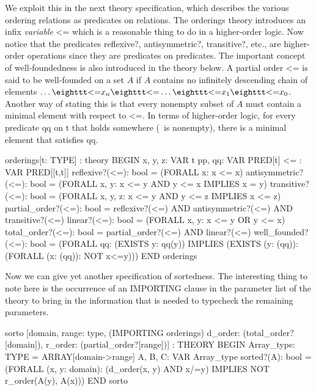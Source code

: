 We exploit this in the next theory specification, which describes the
various ordering relations as predicates on relations.  The {\stt
orderings} theory introduces an infix {\em variable\/} {\stt <=} which
is a reasonable thing to do in a higher-order logic.  Now notice that
the predicates {\stt reflexive?}, {\stt antisymmetric?}, {\stt
transitive?}, etc., are higher-order operations since they are
predicates on predicates.  The important concept of well-foundedness is
also introduced in the theory below.  A partial order {\stt <=} is said
to be well-founded on a set $A$ if $A$ contains no infinitely descending
chain of elements $\ldots \mbox{\tt <=} x_n \mbox{\tt <=} \ldots
\mbox{\tt <=} x_1 \mbox{\tt <=} x_0$.  Another way of stating this is
that every nonempty subset of $A$ must contain a minimal element with
respect to {\stt <=}.  In terms of higher-order logic, for every
predicate {\stt qq} on {\stt t} that holds somewhere (\ie\ is nonempty),
there is a minimal element that satisfies {\stt qq}.

\begin{pvsexample}
  orderings[t: TYPE] : theory
   BEGIN
    x, y, z: VAR t
    pp, qq: VAR PRED[t]
    <= : VAR PRED[[t,t]]
    reflexive?(<=): bool =  (FORALL x: x <= x)
    antisymmetric?(<=): bool = (FORALL x, y: x <= y AND y <= x IMPLIES x = y)
    transitive?(<=): bool =
      (FORALL x, y, z: x <= y AND y <= z IMPLIES x <= z)
    partial_order?(<=): bool =
      reflexive?(<=) AND antisymmetric?(<=) AND transitive?(<=)
    linear?(<=): bool = (FORALL x, y: x <= y OR y <= x)
    total_order?(<=): bool = partial_order?(<=) AND linear?(<=)
    well_founded?(<=): bool =
      (FORALL qq: (EXISTS y: qq(y))
           IMPLIES (EXISTS (y: (qq)): (FORALL (x: (qq)): NOT x<=y)))
   END orderings
\end{pvsexample}

Now we can give yet another specification of sortedness.  The
interesting thing to note here is the occurrence of an {\stt IMPORTING}
clause in the parameter list of the theory to bring in the information
that is needed to typecheck the remaining parameters.
\begin{pvsexample}
  sorto [domain, range: type,
         (IMPORTING orderings)
         d_order: (total_order?[domain]),
         r_order: (partial_order?[range])] : THEORY
   BEGIN
    Array_type: TYPE = ARRAY[domain->range]
    A, B, C: VAR Array_type
    sorted?(A): bool =
      (FORALL (x, y: domain): (d_order(x, y) AND x/=y)
                      IMPLIES NOT r_order(A(y), A(x)))
   END sorto
\end{pvsexample}

